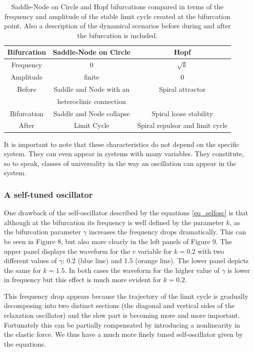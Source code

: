 \documentclass{article}
\begin{document}
\begin{table}[h!]
\begin{center}
\begin{tabular}{ |c|c|c| }
 \hline
 Bifurcation & Saddle-Node on Circle & Hopf \\ 
 \hline
 \hline
 Frequency & 0 &  $\sqrt{k}$ \\
 \hline
 Amplitude & finite & 0 \\ 
 \hline
 Before & Saddle and Node with an & Spiral attractor \\ 
 & heteroclinic connection & \\
 \hline
 Bifurcation & Saddle and Node collapse & Spiral loose stability \\ 
 \hline
 After & Limit Cycle & Spiral repulsor and limit cycle\\
 \hline
\end{tabular}
\caption{Saddle-Node on Circle and Hopf bifurcations compared in terms of the frequency and amplitude of the stable limit cycle created at the bifurcation point. Also a description of the dynamical scenarios before during and after the bifurcation is included.}
\end{center}
\end{table}

It is important to note that these characteristics do not depend on the specific system. 
They can even appear in systems with many variables. 
They constitute, so to speak, classes of universality in the way an oscillation can appear in the system.



\subsubsection{A self-tuned oscillator}

One drawback of the self-oscillator described by the equations \ref{eq_selfosc} is that although at the bifurcation its frequency is well defined by the parameter $k$, as the bifurcation parameter $\gamma$ increases the frequency drops dramatically. 
This can be seen in Figure 8, but also more clearly in the left panels of Figure 9. 
The upper panel displays the waveform for the $v$ variable for $k=0.2$ with two different values of $\gamma$: 0.2 (blue line) and 1.5 (orange line). 
The lower panel depicts the same for $k=1.5$. 
In both cases the waveform for the higher value of $\gamma$ is lower in frequency but this effect is much more evident for $k=0.2$.

This frequency drop appears because the trajectory of the limit cycle is gradually decomposing into two distinct sections (the diagonal and vertical sides of the relaxation oscillator) and the slow part is becoming more and more important. 
Fortunately this can be partially compensated by introducing a nonlinearity in the elastic force. 
We thus have a much more finely tuned self-oscillator given by the equations.
\end{document}
